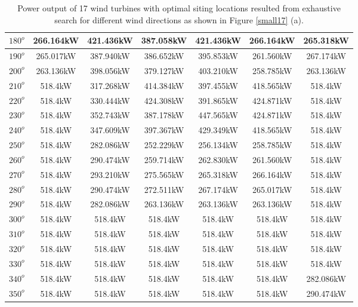 \begin{table}[H]
\begin{tabular}{|c|c|c|c|c|c|c|}
		$180^o$	& 266.164kW	& 421.436kW	& 387.058kW	& 421.436kW	& 266.164kW	& 265.318kW	\\ \hline
		$190^o$	& 265.017kW	& 387.940kW	& 386.652kW	& 395.853kW	& 261.560kW	& 267.174kW	\\ \hline
		$200^o$	& 263.136kW	& 398.056kW	& 379.127kW	& 403.210kW	& 258.785kW	& 263.136kW	\\ \hline
		$210^o$	& 518.4kW	& 317.268kW	& 414.384kW	& 397.455kW	& 418.565kW	& 518.4kW	\\ \hline
		$220^o$	& 518.4kW	& 330.444kW	& 424.308kW	& 391.865kW	& 424.871kW	& 518.4kW	\\ \hline
		$230^o$	& 518.4kW	& 352.743kW	& 387.178kW	& 447.565kW	& 424.871kW	& 518.4kW	\\ \hline
		$240^o$	& 518.4kW	& 347.609kW	& 397.367kW	& 429.349kW	& 418.565kW	& 518.4kW	\\ \hline
		$250^o$	& 518.4kW	& 282.086kW	& 252.229kW	& 256.134kW	& 258.785kW	& 518.4kW	\\ \hline
		$260^o$	& 518.4kW	& 290.474kW	& 259.714kW	& 262.830kW	& 261.560kW	& 518.4kW	\\ \hline
		$270^o$	& 518.4kW	& 293.210kW	& 275.565kW	& 265.318kW	& 266.164kW	& 518.4kW	\\ \hline
		$280^o$	& 518.4kW	& 290.474kW	& 272.511kW	& 267.174kW	& 265.017kW	& 518.4kW	\\ \hline
		$290^o$	& 518.4kW	& 282.086kW	& 263.136kW	& 263.136kW	& 263.136kW	& 518.4kW	\\ \hline
		$300^o$	& 518.4kW	& 518.4kW	& 518.4kW	& 518.4kW	& 518.4kW	& 518.4kW	\\ \hline
		$310^o$	& 518.4kW	& 518.4kW	& 518.4kW	& 518.4kW	& 518.4kW	& 518.4kW	\\ \hline
		$320^o$	& 518.4kW	& 518.4kW	& 518.4kW	& 518.4kW	& 518.4kW	& 518.4kW	\\ \hline
		$330^o$	& 518.4kW	& 518.4kW	& 518.4kW	& 518.4kW	& 518.4kW	& 518.4kW	\\ \hline
		$340^o$	& 518.4kW	& 518.4kW	& 518.4kW	& 518.4kW	& 518.4kW	& 282.086kW	\\ \hline
		$350^o$	& 518.4kW	& 518.4kW	& 518.4kW	& 518.4kW	& 518.4kW	& 290.474kW	\\ \hline
        	\end{tabular}
        	\caption{Power output of 17 wind turbines with optimal siting locations resulted from exhaustive search for different wind directions as shown in Figure \ref{small17} (a).}
        	\label{table17a}
        \end{table}
